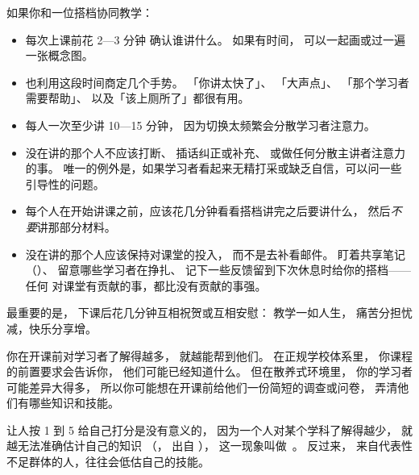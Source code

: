 如果你和一位搭档协同教学：

\begin{itemize}

\item
  每次上课前花 2—3 分钟
  确认谁讲什么。
  如果有时间，
  可以一起画或过一遍一张概念图。

\item
  也利用这段时间商定几个手势。
  「你讲太快了」、
  「大声点」、
  「那个学习者需要帮助」、
  以及「该上厕所了」都很有用。

\item
  每人一次至少讲 10—15 分钟，
  因为切换太频繁会分散学习者注意力。

\item
  没在讲的那个人不应该打断、
  插话纠正或补充、
  或做任何分散主讲者注意力的事。
  唯一的例外是，如果学习者看起来无精打采或缺乏自信，可以问一些引导性的问题。

\item
  每个人在开始讲课之前，应该花几分钟看看搭档讲完之后要讲什么，
  然后\emph{不要}讲那部分材料。

\item
  没在讲的那个人应该保持对课堂的投入，
  而不是去补看邮件。
  盯着共享笔记（）、
  留意哪些学习者在挣扎、
  记下一些反馈留到下次休息时给你的搭档——任何
  对课堂有贡献的事，都比没有贡献的事强。

\end{itemize}

最重要的是，
下课后花几分钟互相祝贺或互相安慰：
教学一如人生，
痛苦分担忧减，快乐分享增。


你在开课前对学习者了解得越多，
就越能帮到他们。
在正规学校体系里，
你课程的前置要求会告诉你，
他们可能已经知道什么。
但在散养式环境里，
你的学习者可能差异大得多，
所以你可能想在开课前给他们一份简短的调查或问卷，
弄清他们有哪些知识和技能。

让人按 1 到 5 给自己打分是没有意义的，
因为一个人对某个学科了解得越少，
就越无法准确估计自己的知识
（，
出自 ），
这一现象叫做~\cite{Krug1999}。
反过来，
来自代表性不足群体的人，往往会低估自己的技能。


